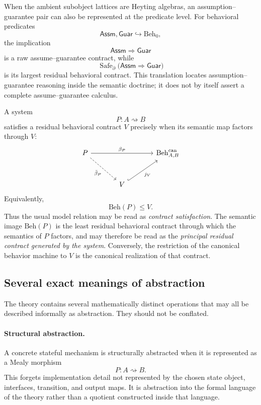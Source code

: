 When the ambient subobject lattices are Heyting algebras, an
assumption--guarantee pair can also be represented at the predicate level.
For behavioral predicates
\[
  \mathsf{Assm},\mathsf{Guar}
  \hookrightarrow
  \mathrm{Beh}_0,
\]
the implication
\[
  \mathsf{Assm}\Rightarrow\mathsf{Guar}
\]
is a raw assume--guarantee contract, while
\[
  \operatorname{Safe}_{\partial}
  \bigl(\mathsf{Assm}\Rightarrow\mathsf{Guar}\bigr)
\]
is its largest residual behavioral contract.  This translation locates
assumption--guarantee reasoning inside the semantic doctrine; it does not by
itself assert a complete assume--guarantee calculus.

A system
\[
  P:A\rightsquigarrow B
\]
satisfies a residual behavioral contract \(V\) precisely when its semantic map
factors through \(V\):
\[
\begin{tikzcd}[column sep=large,row sep=large]
  P
    \ar[rr,"\beta_P"]
    \ar[dr,dashed,"\bar\beta_P"']
  &&
  \mathrm{Beh}^{\mathrm{can}}_{A,B}
  \\
  &
  V
    \ar[ur,hook,"j_V"']
  &
\end{tikzcd}
\]
Equivalently,
\[
  \mathrm{Beh}(P)\leq V.
\]
Thus the usual model relation may be read as \emph{contract satisfaction}.
The semantic image \(\mathrm{Beh}(P)\) is the least residual behavioral
contract through which the semantics of \(P\) factors, and may therefore be
read as the \emph{principal residual contract generated by the system}.
Conversely, the restriction of the canonical behavior machine to \(V\) is the
canonical realization of that contract.

\subsection{Several exact meanings of abstraction}
\label{subsec:several-exact-meanings-abstraction}

The theory contains several mathematically distinct operations that may all be
described informally as abstraction.  They should not be conflated.

\paragraph{Structural abstraction.}
A concrete stateful mechanism is structurally abstracted when it is represented
as a Mealy morphism
\[
  P:A\rightsquigarrow B.
\]
This forgets implementation detail not represented by the chosen state object,
interfaces, transition, and output maps.  It is abstraction into the formal
language of the theory rather than a quotient constructed inside that
language.

